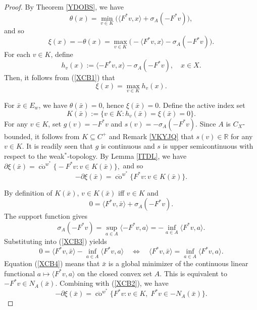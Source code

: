 \documentclass[10pt,a4paper]{amsart}
\begin{document}
\begin{proof}
	By Theorem \ref{YDOBS}, we have
$$
	\theta(x) = \min_{v \in K} \bigl( \langle F^*v, x \rangle + \sigma_A(-F^*v) \bigr),  
$$
 and so 
\begin{equation}\label{XCB1}
	\xi(x) = -\theta(x) = \max_{v \in K} \bigl( -\langle F^*v, x \rangle - \sigma_A(-F^*v) \bigr).  
 \end{equation}
	For each $v \in K$, define
	\[
	h_v(x) := \langle -F^*v, x \rangle - \sigma_A(-F^*v), \quad x \in X.
	\]
	Then,  it follows from  (\ref{XCB1})  that
	\[
	\xi(x) = \max_{v \in K} h_v(x).
	\]
	
	For $\bar{x} \in E_w$, we have $\theta(\bar{x}) = 0$, hence $\xi(\bar{x}) = 0$. Define the active index set
	\[
	K(\bar{x}) := \{ v \in K : h_v(\bar{x}) = \xi(\bar{x}) = 0 \}.
	\]
		For any $v \in K$, set $g(v) = -F^*v$ and $s(v) = - \sigma_A(-F^*v)$.   Since $A$ is $C_X$-bounded, it follows from  $K \subseteq C^+$ and   Remark   \ref{VKYJQ}    that $s(v) \in \mathbb{R}$ for any $v \in K$.
		  It is readily seen that   $g$ is continuous   and   $s$ is upper semicontinuous with respect to the weak$^*$-topology.
		By Lemma \ref{ITDL}, we have
$	\partial \xi(\bar{x}) = \overline{\operatorname{co}}^{w^*} \bigl\{ -F^*v : v \in K(\bar{x}) \bigr\}, $
and so 
\begin{equation}\label{XCB2}
	- \partial \xi(\bar{x}) = \overline{\operatorname{co}}^{w^*} \bigl\{ F^*v : v \in K(\bar{x}) \bigr\}.  
 \end{equation}
	
	By definition of $K(\bar{x})$, $v \in K(\bar{x})$ iff $v \in K$ and
\begin{equation}\label{XCB3}
	0 = \langle F^*v, \bar{x} \rangle + \sigma_A(-F^*v).  
 \end{equation}
	The support function gives
	\[
	\sigma_A(-F^*v) = \sup_{a \in A} \langle -F^*v, a \rangle = - \inf_{a \in A} \langle F^*v, a \rangle.
	\]
	Substituting into  (\ref{XCB3}) yields
\begin{equation}\label{XCB4}
	0 = \langle F^*v, \bar{x} \rangle - \inf_{a \in A} \langle F^*v, a \rangle
	\quad \Longleftrightarrow \quad
	\langle F^*v, \bar{x} \rangle = \inf_{a \in A} \langle F^*v, a \rangle.  
 \end{equation}
		Equation (\ref{XCB4}) means that $\bar{x}$ is a global minimizer of the continuous linear functional $a \mapsto \langle F^*v, a \rangle$ on the closed convex set $A$. This is equivalent to
$	-F^*v \in N_A(\bar{x}).$
	Combining with (\ref{XCB2}), we have
\begin{equation}\label{XCB++}
	-\partial \xi(\bar{x}) = \overline{\operatorname{co}}^{w^*} \bigl\{ F^*v : v \in K,\; F^*v \in -N_A(\bar{x}) \bigr\}.
 \end{equation}
	

\end{proof}
\end{document}

